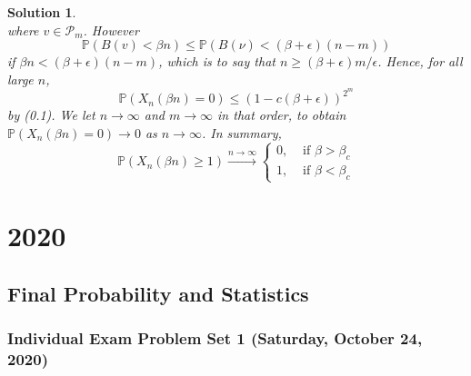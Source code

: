 \documentclass[12pt]{amsart}
\newtheorem*{solution}{Solution}
\begin{document}
\begin{solution}
$$$$
where $v \in \mathcal{P}_m$. However
$$
\mathbb{P}(B(v)<\beta n) \leq \mathbb{P}(B(\nu)<(\beta+\epsilon)(n-m))
$$
if $\beta n<(\beta+\epsilon)(n-m)$, which is to say that $n \geq(\beta+\epsilon) m / \epsilon$. Hence, for all large $n$,
$$
\mathbb{P}(X_n(\beta n)=0) \leq(1-c(\beta+\epsilon))^{2^m}
$$
by (0.1). We let $n \rightarrow \infty$ and $m \rightarrow \infty$ in that order, to obtain $\mathbb{P}(X_n(\beta n)=0) \rightarrow 0$ as $n \rightarrow \infty$. In summary,
$$
\mathbb{P}(X_n(\beta n) \geq 1) \xrightarrow{n \rightarrow \infty} \begin{cases}0, & \text { if } \beta>\beta_c \\ 1, & \text { if } \beta<\beta_c\end{cases}
$$
\end{solution}

\section*{2020}
\subsection*{Final Probability and Statistics}

\subsubsection*{Individual Exam Problem Set 1 (Saturday, October 24, 2020)}
\end{document}
